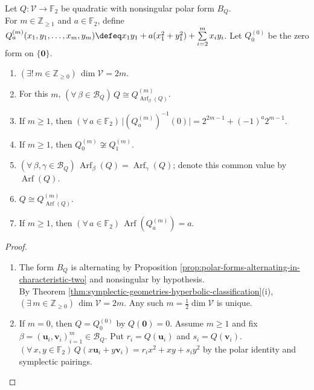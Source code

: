\begin{theorem} \label{thm:f2-quadratic-refinements-arf-classification} \\
Let $Q:\mathcal{V}\to\mathbb{F}_2$ be quadratic with nonsingular polar form $B_Q$.\\
For $m\in\mathbb{Z}_{\geq1}$ and $a\in\mathbb{F}_2$, define $Q_a^{(m)}(x_1,y_1,\ldots,x_m,y_m)\defeq x_1y_1+a(x_1^2+y_1^2)+\sum\limits_{i=2}^{m}x_iy_i$. Let $Q_0^{(0)}$ be the zero form on $\{\mathbf{0}\}$.
\begin{enumerate}[label=(\roman*)]
\setlength{\itemsep}{0pt}
\item $(\exists!\,m\in\mathbb{Z}_{\geq0})\,\dim\mathcal{V}=2m$.
\item For this $m$, $(\forall\,\beta\in\mathscr{B}_Q)\,Q\cong Q_{\operatorname{Arf}_{\beta}(Q)}^{(m)}$.
\item If $m\geq1$, then $(\forall\,a\in\mathbb{F}_2)\,\lvert(Q_a^{(m)})^{-1}(0)\rvert=2^{2m-1}+(-1)^a2^{m-1}$.
\item If $m\geq1$, then $Q_0^{(m)}\not\cong Q_1^{(m)}$.
\item $(\forall\,\beta,\gamma\in\mathscr{B}_Q)\,\operatorname{Arf}_{\beta}(Q)=\operatorname{Arf}_{\gamma}(Q)$; denote this common value by $\operatorname{Arf}(Q)$.
\item $Q\cong Q_{\operatorname{Arf}(Q)}^{(m)}$.
\item If $m\geq1$, then $(\forall\,a\in\mathbb{F}_2)\,\operatorname{Arf}(Q_a^{(m)})=a$.
\end{enumerate}
\begin{proof}
\begin{enumerate}[label=(\roman*)]
\setlength{\itemsep}{0pt}
\item The form $B_Q$ is alternating by Proposition \ref{prop:polar-forms-alternating-in-characteristic-two} and nonsingular by hypothesis.\\
By Theorem \ref{thm:symplectic-geometries-hyperbolic-classification}(i), $(\exists\,m\in\mathbb{Z}_{\geq0})\,\dim\mathcal{V}=2m$. Any such $m=\frac{1}{2}\dim\mathcal{V}$ is unique.
\item If $m=0$, then $Q=Q_0^{(0)}$ by $Q(\mathbf{0})=0$. Assume $m\geq1$ and fix $\beta=(\mathbf{u}_i,\mathbf{v}_i)_{i=1}^{m}\in\mathscr{B}_Q$. Put $r_i=Q(\mathbf{u}_i)$ and $s_i=Q(\mathbf{v}_i)$.\\
$(\forall\,x,y\in\mathbb{F}_2)\,Q(x\mathbf{u}_i+y\mathbf{v}_i)=r_ix^2+xy+s_iy^2$ by the polar identity and symplectic pairings.\\

\end{enumerate}
\end{proof}
\end{theorem}
